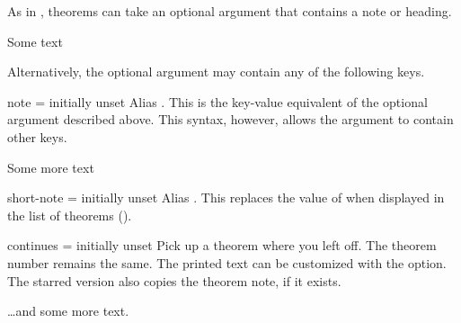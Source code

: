 \documentclass{ltxdoc}
\begin{document}
As in , theorems can take an optional argument that contains a note or heading.

\begin{keythmscode}[]
\begin{theorem}
Some text
\end{theorem}
\end{keythmscode}

Alternatively, the optional argument may contain any of the following keys.

\begin{docKey}{note}
  {=}
  {initially unset}
Alias .
This is the key-value equivalent of the optional argument described above.
This syntax, however, allows the argument to contain other keys.

\begin{keythmscode}[]
\begin{theorem}[note=another heading]
Some more text
\end{theorem}
\end{keythmscode}

\end{docKey}

\begin{docKey}{short-note}
  {=}
  {initially unset}
Alias .
This replaces the value of  when displayed in the list of theorems ().
\end{docKey}


\begin{docKey}{continues}
  {\sarg=}
  {initially unset}
Pick up a theorem where you left off.
The theorem number remains the same.
The printed text can be customized with the  option.
The starred version also copies the theorem note, if it exists.

\begin{keythmscode}[]
\begin{theorem}[continues=foo]
\dots and some more text.
\end{theorem}
\end{keythmscode}

\end{docKey}
\end{document}
